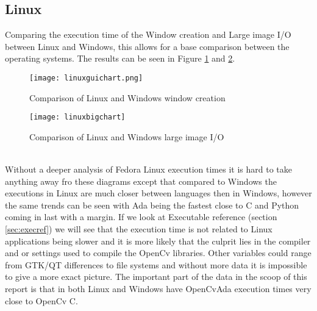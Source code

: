 \subsection{Linux}
Comparing the execution time of the Window creation and Large image I/O between Linux and Windows, this allows for a base comparison between the operating systems. The results can be seen in Figure \ref{fig:linuxguichart} and \ref{fig:linuxbigchart}.
\begin{figure}
\centering
\texttt{[image: linuxguichart.png]}
\caption{Comparison of Linux and Windows window creation}
\label{fig:linuxguichart}
\end{figure}
\begin{figure}
\centering
\texttt{[image: linuxbigchart]}
\caption{Comparison of Linux and Windows large image I/O}
\label{fig:linuxbigchart}
\end{figure}
\\Without a deeper analysis of Fedora Linux execution times it is hard to take anything away fro these diagrams except that compared to Windows the executions in Linux are much closer between languages then in Windows, however the same trends can be seen with Ada being the fastest close to C and Python coming in last with a margin. If we look at Executable reference (section \ref{sec:execref})  we will see that the execution time is not related to Linux applications being slower and it is more likely that the culprit lies in the compiler and or settings used to compile the OpenCv libraries. Other variables could range from GTK/QT differences to file systems and without more data it is impossible to give a more exact picture. The important part of the data in the scoop of this report is that in both Linux and Windows have OpenCvAda execution times very close to OpenCv C.
